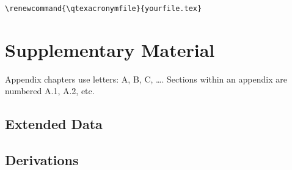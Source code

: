 \documentclass[sans,oneside,numeric,raggedright,fullwidth]{qbook}
\begin{document}
\noindent\verb|\renewcommand{\qtexacronymfile}{yourfile.tex}|

\lipsum[11]

\backmatter

\appendix
\chapter{Supplementary Material}\label{app:supplement}

Appendix chapters use letters: A, B, C, \ldots.  Sections within an
appendix are numbered A.1, A.2, etc.

\section{Extended Data}\label{app:data}

\lipsum[12]

\section{Derivations}\label{app:derivations}

\lipsum[13]

\end{document}
